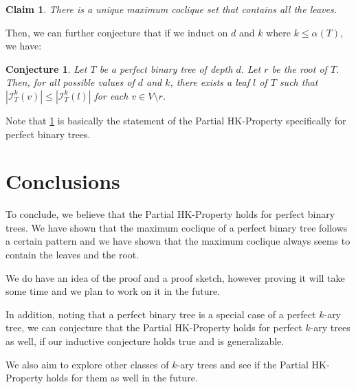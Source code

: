 \documentclass[11pt,a4paper]{article}
\newtheorem{conjecture}[theorem]{Conjecture}
\newtheorem{claim}{Claim}[section]
\theoremstyle{definition}
\begin{document}
\begin{claim}
	There is a unique maximum coclique set that contains all the leaves.
\end{claim}

Then, we can further conjecture that if we induct on $d$ and $k$ where $k \leq \alpha(T)$, we have:

\begin{conjecture}\label{conjecture_ptb_partial_hk}
	Let $T$ be a perfect binary tree of depth $d$. Let $r$ be the root of $T$. Then, for all possible values of $d$ and $k$, there exists a leaf $l$ of $T$ such that $|\mathcal{I}^k_T(v)| \leq |\mathcal{I}^k_T(l)|$ for each $v \in V\setminus{r}$.
\end{conjecture}

Note that \ref{conjecture_ptb_partial_hk} is basically the statement of the Partial HK-Property specifically for perfect binary trees.

\section{Conclusions}

To conclude, we believe that the Partial HK-Property holds for perfect binary trees. We have shown that the maximum coclique of a perfect binary tree follows a certain pattern and we have shown that the maximum coclique always seems to contain the leaves and the root.

We do have an idea of the proof and a proof sketch, however proving it will take some time and we plan to work on it in the future.

In addition, noting that a perfect binary tree is a special case of a perfect $k$-ary tree, we can conjecture that the Partial HK-Property holds for perfect $k$-ary trees as well, if our inductive conjecture holds true and is generalizable.

We also aim to explore other classes of $k$-ary trees and see if the Partial HK-Property holds for them as well in the future.




\end{document}
